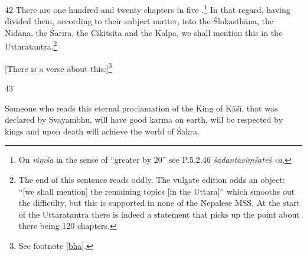 \begin{translation}

\item [42] There are one hundred and twenty chapters in five
.\footnote{On \emph{viṃśa} in the sense of “greater by 20”
see P.5.2.46 \emph{śadantaviṃśateś ca}.}  In that regard, having divided them,
according to their subject matter, into the Ślokasthāna, the Nidāna, the Śārīra,
the Cikitsita and the Kalpa, we shall mention this in the
Uttaratantra.\footnote{The end of this sentence reads oddly.  The vulgate edition
adds an object: “[we shall mention] the remaining topics [in the Uttara]” which
smooths out the difficulty, but this is supported in none of the Nepalese MSS.  At
the start of the Uttaratantra \citep[1.3--4ab]{vulgate} there is indeed a
statement that picks up the point about there being 120 chapters.}

\medskip

[There is a verse about this:]\footnote{See footnote \ref{bha}.}

\item[43]    
\begin{sloka}
    Someone who reads this eternal proclamation of the King of
    Kāśī, that was declared by Svayambhu, will have good karma on earth, will
    be respected by kings and upon death will achieve the world of Śakra.
\end{sloka}

\end{translation}    



